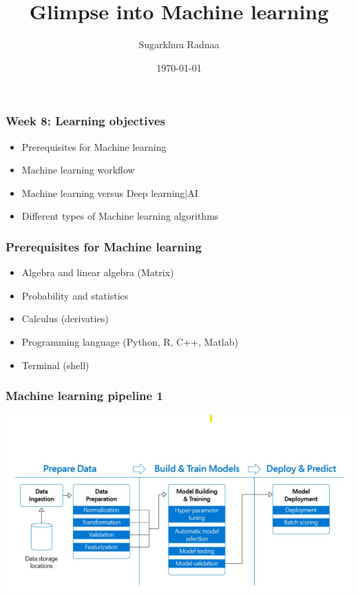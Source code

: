 \documentclass{beamer}
\title[Introduction to Python]{Glimpse into Machine learning}
\author{Sugarkhuu Radnaa}
\institute[]
{
Py4Econ in Ulaanbaatar \\ 
\medskip
\textit{py4econ@gmail.com} 
}
\date{\today}  %
\begin{document}
\begin{frame}
\titlepage %
\end{frame}

\begin{frame}
    \frametitle{Week 8: Learning objectives}
    \begin{itemize}
        \item Prerequisites for Machine learning 
        \item Machine learning workflow
        \item Machine learning versus Deep learning|AI
        \item Different types of Machine learning algorithms
    \end{itemize}
\end{frame}


\begin{frame}
    \frametitle{Prerequisites for Machine learning}
            \begin{itemize}
                \item Algebra and linear algebra (Matrix)
                \item Probability and statistics
                \item Calculus (derivaties)
                \item Programming language (Python, R, C++, Matlab)
                \item Terminal (shell)                
            \end{itemize}
\end{frame}

\begin{frame}
    \frametitle{Machine learning pipeline 1}
    \begin{center}
        \includegraphics[scale=0.5]{figures/ML_pipe.jpg}
    \end{center}
\end{frame}
\end{document}
